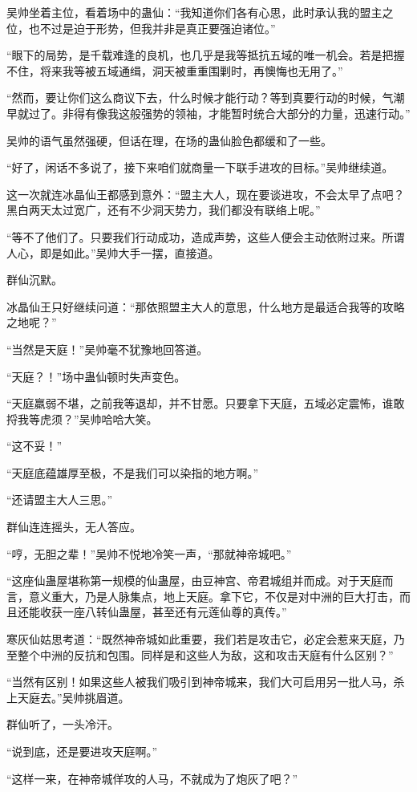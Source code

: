\begin{this_body}
吴帅坐着主位，看着场中的蛊仙：“我知道你们各有心思，此时承认我的盟主之位，也不过是迫于形势，但我并非是真正要强迫诸位。”

“眼下的局势，是千载难逢的良机，也几乎是我等抵抗五域的唯一机会。若是把握不住，将来我等被五域通缉，洞天被重重围剿时，再懊悔也无用了。”

“然而，要让你们这么商议下去，什么时候才能行动？等到真要行动的时候，气潮早就过了。非得有像我这般强势的领袖，才能暂时统合大部分的力量，迅速行动。”

吴帅的语气虽然强硬，但话在理，在场的蛊仙脸色都缓和了一些。

“好了，闲话不多说了，接下来咱们就商量一下联手进攻的目标。”吴帅继续道。

这一次就连冰晶仙王都感到意外：“盟主大人，现在要谈进攻，不会太早了点吧？黑白两天太过宽广，还有不少洞天势力，我们都没有联络上呢。”

“等不了他们了。只要我们行动成功，造成声势，这些人便会主动依附过来。所谓人心，即是如此。”吴帅大手一摆，直接道。

群仙沉默。

冰晶仙王只好继续问道：“那依照盟主大人的意思，什么地方是最适合我等的攻略之地呢？”

“当然是天庭！”吴帅毫不犹豫地回答道。

“天庭？！”场中蛊仙顿时失声变色。

“天庭羸弱不堪，之前我等退却，并不甘愿。只要拿下天庭，五域必定震怖，谁敢捋我等虎须？”吴帅哈哈大笑。

“这不妥！”

“天庭底蕴雄厚至极，不是我们可以染指的地方啊。”

“还请盟主大人三思。”

群仙连连摇头，无人答应。

“哼，无胆之辈！”吴帅不悦地冷笑一声，“那就神帝城吧。”

“这座仙蛊屋堪称第一规模的仙蛊屋，由豆神宫、帝君城组并而成。对于天庭而言，意义重大，乃是人脉集点，地上天庭。拿下它，不仅是对中洲的巨大打击，而且还能收获一座八转仙蛊屋，甚至还有元莲仙尊的真传。”

寒灰仙姑思考道：“既然神帝城如此重要，我们若是攻击它，必定会惹来天庭，乃至整个中洲的反抗和包围。同样是和这些人为敌，这和攻击天庭有什么区别？”

“当然有区别！如果这些人被我们吸引到神帝城来，我们大可启用另一批人马，杀上天庭去。”吴帅挑眉道。

群仙听了，一头冷汗。

“说到底，还是要进攻天庭啊。”

“这样一来，在神帝城佯攻的人马，不就成为了炮灰了吧？”


\end{this_body}
